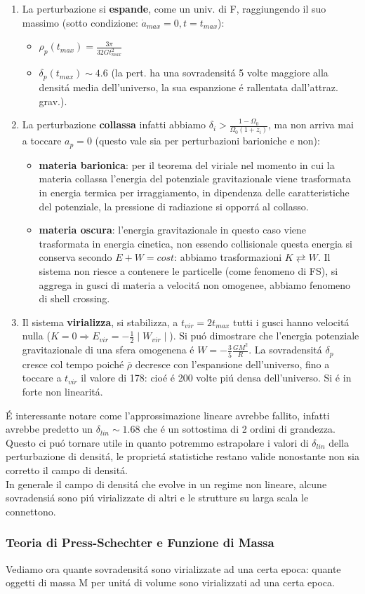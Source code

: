 \documentclass[12pt, a4paper]{article}
\begin{document}
\begin{enumerate}
\item La perturbazione si \textbf{espande}, come un univ. di F, raggiungendo il suo massimo (sotto condizione: $\dot{a}_{max}=0, t=t_{max}$):
\begin{itemize}
\item $\rho_p(t_{max})=\frac{3\pi}{32 G t^2_{max}}$
\item $\delta_p(t_{max})\sim 4.6$ (la pert. ha una sovradensit\'{a} 5 volte maggiore alla densit\'{a} media dell'universo, la sua espanzione \'{e} rallentata dall'attraz. grav.).
\end{itemize}
\item La perturbazione \textbf{collassa} infatti abbiamo $\delta_i>\frac{1-\Omega_0}{\Omega_0(1+z_i)}$, ma non arriva mai a toccare $a_p=0$ (questo vale sia per perturbazioni barioniche e non):
\begin{itemize}
\item \textbf{materia barionica}: per il teorema del viriale nel momento in cui la materia collassa l'energia del potenziale gravitazionale viene trasformata in energia termica per irraggiamento, in dipendenza delle caratteristiche del potenziale, la pressione di radiazione si opporr\'{a} al collasso.
\item \textbf{materia oscura}: l'energia gravitazionale in questo caso viene trasformata in energia cinetica, non essendo collisionale questa energia si conserva secondo $ E+W=cost $: abbiamo trasformazioni $K \rightleftarrows W$. Il sistema non riesce a contenere le particelle (come fenomeno di FS), si aggrega in gusci di materia a velocit\'{a} non omogenee, abbiamo fenomeno di shell crossing. 
\end{itemize}
\item Il sistema \textbf{virializza}, si stabilizza, a $t_{vir}=2t_{max}$ tutti i gusci hanno velocit\'{a} nulla ($K=0 \Rightarrow E_{vir}= -\frac{1}{2}\mid W_{vir}\mid $). Si pu\'{o} dimostrare che l'energia potenziale gravitazionale di una sfera omogenena \'{e} $W=-\frac{3}{5}\frac{GM^2}{R}$. La sovradensit\'{a} $\delta_p $ cresce col tempo poich\'{e} $\bar{\rho}$ decresce con l'espansione dell'universo, fino a toccare a $t_{vir}$ il valore di 178: cio\'{e} \'{e } 200 volte pi\'{u} densa dell'universo. Si \'{e} in forte non linearit\'{a}.
\end{enumerate}
\'{E} interessante notare come l'approssimazione lineare avrebbe fallito, infatti avrebbe predetto un $\delta_{lin}\sim 1.68$ che \'{e} un sottostima di 2 ordini di grandezza. Questo ci pu\'{o} tornare utile in quanto potremmo estrapolare i valori di $\delta_{lin}$ della perturbazione di densit\'{a}, le propriet\'{a} statistiche restano valide nonostante non sia corretto il campo di densit\'{a}.\\
In generale il campo di densit\'{a} che evolve in un regime non lineare, alcune sovradensi\'{a} sono pi\'{u} virializzate di altri e le strutture su larga scala le connettono. 
\subsubsection{Teoria di Press-Schechter e Funzione di Massa}
Vediamo ora quante sovradensit\'{a} sono virializzate ad una certa epoca: quante oggetti di massa M per unit\'{a} di volume sono virializzati ad una certa epoca.
\end{document}
